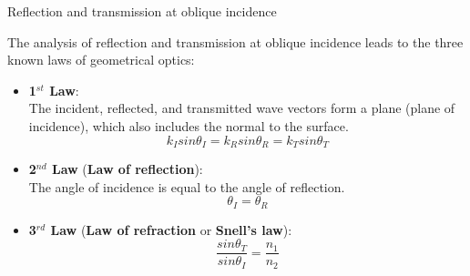 %
%
%

\begin{frame}{Reflection and transmission at oblique incidence}

The analysis of reflection and transmission at oblique incidence
leads to the three known laws of geometrical optics:

\begin{itemize}
  \item {\bf 1$^{st}$ Law}:\\
     The incident, reflected, and transmitted wave vectors form a plane (plane of incidence),
     which also includes the normal to the surface.
     \begin{equation*}
          k_I sin\theta_I = k_R sin\theta_R = k_T sin\theta_T
      \end{equation*}
  \item {\bf 2$^{nd}$ Law} ({\bf Law of reflection}):\\
     The angle of incidence is equal to the angle of reflection.
     \begin{equation*}
          \theta_I = \theta_R
      \end{equation*}
  \item {\bf 3$^{rd}$ Law} ({\bf Law of refraction} or {\bf Snell's law}):\\
     \begin{equation*}
          \frac{sin\theta_T}{sin\theta_I} = \frac{n_1}{n_2}
      \end{equation*}

\end{itemize}

\end{frame}


%
%

